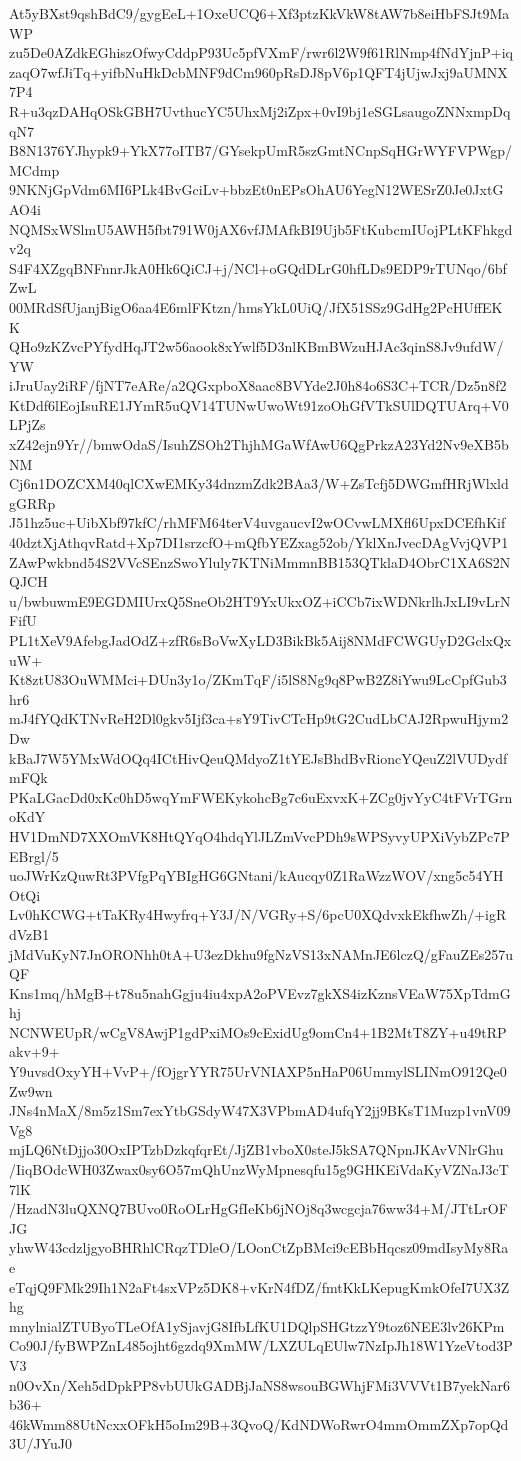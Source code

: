 At5yBXst9qshBdC9/gygEeL+1OxeUCQ6+Xf3ptzKkVkW8tAW7b8eiHbFSJt9MaWP
zu5De0AZdkEGhiszOfwyCddpP93Uc5pfVXmF/rwr6l2W9f61RlNmp4fNdYjnP+iq
zaqO7wfJiTq+yifbNuHkDcbMNF9dCm960pRsDJ8pV6p1QFT4jUjwJxj9aUMNX7P4
R+u3qzDAHqOSkGBH7UvthucYC5UhxMj2iZpx+0vI9bj1eSGLsaugoZNNxmpDqqN7
B8N1376YJhypk9+YkX77oITB7/GYsekpUmR5szGmtNCnpSqHGrWYFVPWgp/MCdmp
9NKNjGpVdm6MI6PLk4BvGciLv+bbzEt0nEPsOhAU6YegN12WESrZ0Je0JxtGAO4i
NQMSxWSlmU5AWH5fbt791W0jAX6vfJMAfkBI9Ujb5FtKubcmIUojPLtKFhkgdv2q
S4F4XZgqBNFnnrJkA0Hk6QiCJ+j/NCl+oGQdDLrG0hfLDs9EDP9rTUNqo/6bfZwL
00MRdSfUjanjBigO6aa4E6mlFKtzn/hmsYkL0UiQ/JfX51SSz9GdHg2PcHUffEKK
QHo9zKZvcPYfydHqJT2w56aook8xYwlf5D3nlKBmBWzuHJAc3qinS8Jv9ufdW/YW
iJruUay2iRF/fjNT7eARe/a2QGxpboX8aac8BVYde2J0h84o6S3C+TCR/Dz5n8f2
KtDdf6lEojIsuRE1JYmR5uQV14TUNwUwoWt91zoOhGfVTkSUlDQTUArq+V0LPjZs
xZ42ejn9Yr//bmwOdaS/IsuhZSOh2ThjhMGaWfAwU6QgPrkzA23Yd2Nv9eXB5bNM
Cj6n1DOZCXM40qlCXwEMKy34dnzmZdk2BAa3/W+ZsTcfj5DWGmfHRjWlxldgGRRp
J51hz5uc+UibXbf97kfC/rhMFM64terV4uvgaucvI2wOCvwLMXfl6UpxDCEfhKif
40dztXjAthqvRatd+Xp7DI1srzcfO+mQfbYEZxag52ob/YklXnJvecDAgVvjQVP1
ZAwPwkbnd54S2VVcSEnzSwoYluly7KTNiMmmnBB153QTklaD4ObrC1XA6S2NQJCH
u/bwbuwmE9EGDMIUrxQ5SneOb2HT9YxUkxOZ+iCCb7ixWDNkrlhJxLI9vLrNFifU
PL1tXeV9AfebgJadOdZ+zfR6sBoVwXyLD3BikBk5Aij8NMdFCWGUyD2GclxQxuW+
Kt8ztU83OuWMMci+DUn3y1o/ZKmTqF/i5lS8Ng9q8PwB2Z8iYwu9LcCpfGub3hr6
mJ4fYQdKTNvReH2Dl0gkv5Ijf3ca+sY9TivCTcHp9tG2CudLbCAJ2RpwuHjym2Dw
kBaJ7W5YMxWdOQq4ICtHivQeuQMdyoZ1tYEJsBhdBvRioncYQeuZ2lVUDydfmFQk
PKaLGacDd0xKc0hD5wqYmFWEKykohcBg7c6uExvxK+ZCg0jvYyC4tFVrTGrnoKdY
HV1DmND7XXOmVK8HtQYqO4hdqYlJLZmVvcPDh9sWPSyvyUPXiVybZPc7PEBrgl/5
uoJWrKzQuwRt3PVfgPqYBIgHG6GNtani/kAucqy0Z1RaWzzWOV/xng5c54YHOtQi
Lv0hKCWG+tTaKRy4Hwyfrq+Y3J/N/VGRy+S/6pcU0XQdvxkEkfhwZh/+igRdVzB1
jMdVuKyN7JnORONhh0tA+U3ezDkhu9fgNzVS13xNAMnJE6lczQ/gFauZEs257uQF
Kns1mq/hMgB+t78u5nahGgju4iu4xpA2oPVEvz7gkXS4izKznsVEaW75XpTdmGhj
NCNWEUpR/wCgV8AwjP1gdPxiMOs9cExidUg9omCn4+1B2MtT8ZY+u49tRPakv+9+
Y9uvsdOxyYH+VvP+/fOjgrYYR75UrVNIAXP5nHaP06UmmylSLINmO912Qe0Zw9wn
JNs4nMaX/8m5z1Sm7exYtbGSdyW47X3VPbmAD4ufqY2jj9BKsT1Muzp1vnV09Vg8
mjLQ6NtDjjo30OxIPTzbDzkqfqrEt/JjZB1vboX0steJ5kSA7QNpnJKAvVNlrGhu
/IiqBOdcWH03Zwax0sy6O57mQhUnzWyMpnesqfu15g9GHKEiVdaKyVZNaJ3cT7lK
/HzadN3luQXNQ7BUvo0RoOLrHgGfIeKb6jNOj8q3wcgcja76ww34+M/JTtLrOFJG
yhwW43cdzljgyoBHRhlCRqzTDleO/LOonCtZpBMci9cEBbHqcsz09mdIsyMy8Rae
eTqjQ9FMk29Ih1N2aFt4sxVPz5DK8+vKrN4fDZ/fmtKkLKepugKmkOfeI7UX3Zhg
mnylnialZTUByoTLeOfA1ySjavjG8IfbLfKU1DQlpSHGtzzY9toz6NEE3lv26KPm
Co90J/fyBWPZnL485ojht6gzdq9XmMW/LXZULqEUlw7NzIpJh18W1YzeVtod3PV3
n0OvXn/Xeh5dDpkPP8vbUUkGADBjJaNS8wsouBGWhjFMi3VVVt1B7yekNar6b36+
46kWmm88UtNcxxOFkH5oIm29B+3QvoQ/KdNDWoRwrO4mmOmmZXp7opQd3U/JYuJ0
